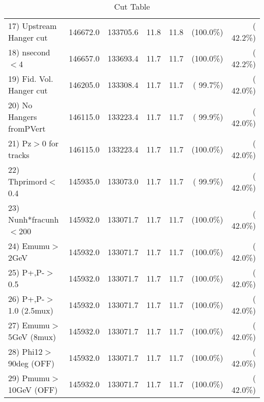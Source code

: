 \begin{table}[h!]
\begin{tabular}{||l||r|r|r|r|r|r||}
 17) Upstream Hanger cut  &     146672.0 &     133705.6 &         11.8 &         11.8 & (100.0\%) & ( 42.2\%) \\
 18) nsecond$<$4          &     146657.0 &     133693.4 &         11.7 &         11.7 & (100.0\%) & ( 42.2\%) \\
 19) Fid. Vol. Hanger cut &     146205.0 &     133308.4 &         11.7 &         11.7 & ( 99.7\%) & ( 42.0\%) \\
 20) No Hangers fromPVert &     146115.0 &     133223.4 &         11.7 &         11.7 & ( 99.9\%) & ( 42.0\%) \\
 21) Pz$>$0 for tracks    &     146115.0 &     133223.4 &         11.7 &         11.7 & (100.0\%) & ( 42.0\%) \\
 22) Thprimord$<$0.4      &     145935.0 &     133073.0 &         11.7 &         11.7 & ( 99.9\%) & ( 42.0\%) \\
 23) Nunh*fracunh$<$200   &     145932.0 &     133071.7 &         11.7 &         11.7 & (100.0\%) & ( 42.0\%) \\
 24) Emumu$>$2GeV         &     145932.0 &     133071.7 &         11.7 &         11.7 & (100.0\%) & ( 42.0\%) \\
 25) P+,P-$>$0.5          &     145932.0 &     133071.7 &         11.7 &         11.7 & (100.0\%) & ( 42.0\%) \\
 26) P+,P-$>$1.0 (2.5mux) &     145932.0 &     133071.7 &         11.7 &         11.7 & (100.0\%) & ( 42.0\%) \\
 27) Emumu$>$5GeV  (8mux) &     145932.0 &     133071.7 &         11.7 &         11.7 & (100.0\%) & ( 42.0\%) \\
 28) Phi12$>$90deg  (OFF) &     145932.0 &     133071.7 &         11.7 &         11.7 & (100.0\%) & ( 42.0\%) \\
 29) Pmumu$>$10GeV  (OFF) &     145932.0 &     133071.7 &         11.7 &         11.7 & (100.0\%) & ( 42.0\%) \\
 \hline
 \hline
 \end{tabular}
 \caption{Cut Table           }
 \label{tab-cutcohjpsi-mumu_jpsi}
 \end{table}

